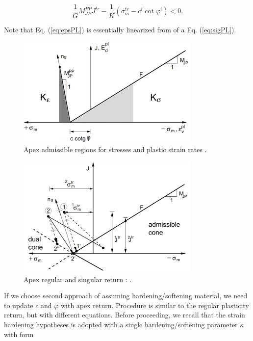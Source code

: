 \begin{equation}\label{eq:flow_condition}
\dfrac{1}{G} M_{JP}^{PP} J^{tr} - \dfrac{1}{K} (\sigma_m^{tr} - c^i \cot \varphi^i) < 0.
\end{equation}

Note that Eq. (\ref{eq:epsPL}) is essentially linearized from of a Eq. (\ref{eq:sigPL}).

\begin{figure}[h!]
	\centering	
	\includegraphics[width=0.8\textwidth, angle=0]{obrazky/apex_cones.png}
	\caption[Apex abmissible regions]{Apex admissible regions for stresses and plastic strain rates \cite{geofem}.} \label{obr:apex_cones}
\end{figure}


\begin{figure}[h!]
	\centering	
	\includegraphics[width=0.8\textwidth, angle=0]{obrazky/apex_recursive_return.png}
	\caption[Apex return]{Apex regular and singular return \cite{geofem}: .} \label{obr:apex_return}
\end{figure}


If we choose second approach of assuming hardening/softening material, we need to update $c$ and $\varphi$ with apex return. Procedure is similar to the regular plasticity return, but with different equations. Before proceeding, we recall that the strain hardening hypotheses is adopted with a single hardening/softening parameter $\kappa$ with form

